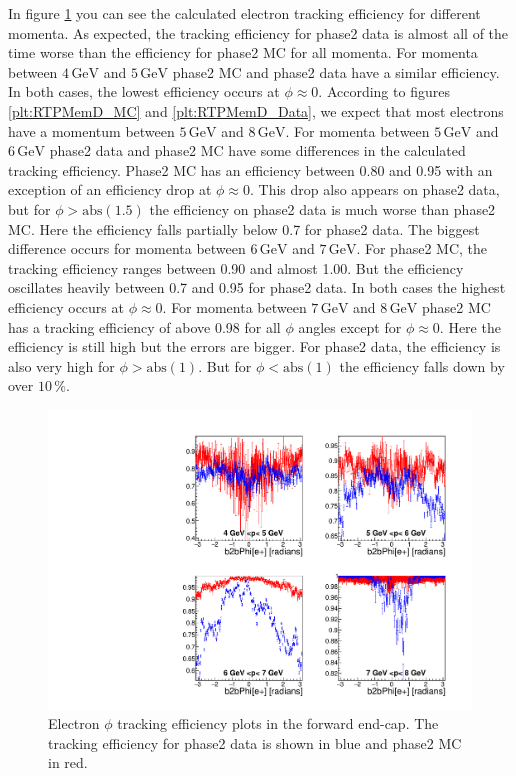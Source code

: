 \documentclass[a4paper,11pt,twosided,final,german,openbib,pdftex,listof=totoc,bibliography=totoc]{scrbook}
\begin{document}
In figure \ref{plt:xPMPhiemFC} you can see the calculated electron tracking efficiency for different momenta. As expected, the tracking efficiency for phase2 data is almost all of the time worse than the efficiency for phase2 MC for all momenta. For momenta between $4\,\textrm{GeV}$ and $5\,\textrm{GeV}$ phase2 MC and phase2 data have a similar efficiency. In both cases, the lowest efficiency occurs at $\phi \approx 0$. According to figures \ref{plt:RTPMemD_MC} and \ref{plt:RTPMemD_Data}, we expect that most electrons have a momentum between $5\,\textrm{GeV}$ and $8\,\textrm{GeV}$. For momenta between $5\,\textrm{GeV}$ and $6\,\textrm{GeV}$ phase2 data and phase2 MC have some differences in the calculated tracking efficiency. Phase2 MC has an efficiency between 0.80 and 0.95 with an exception of an efficiency drop at $\phi \approx 0$. This drop also appears on phase2 data, but for $\phi > \textrm{abs}(1.5)$ the efficiency on phase2 data is much worse than phase2 MC. Here the efficiency falls partially below 0.7 for phase2 data.
The biggest difference occurs for momenta between $6\,\textrm{GeV}$ and $7\,\textrm{GeV}$. For phase2 MC, the tracking efficiency ranges between 0.90 and almost 1.00. But the efficiency oscillates heavily between 0.7 and 0.95 for phase2 data. In both cases the highest efficiency occurs at $\phi \approx 0$. 
For momenta between $7\,\textrm{GeV}$ and $8\,\textrm{GeV}$ phase2 MC has a tracking efficiency of above 0.98 for all $\phi$ angles except for $\phi \approx 0$. Here the efficiency is still high but the errors are bigger. For phase2 data, the efficiency is also very high for $\phi >\textrm{abs}(1)$. But for $\phi < \textrm{abs}(1)$ the efficiency falls down by over $10\,\%$.






\begin{figure}[!htbp]
	\centering
	\includegraphics[width=\textwidth]{Plots/master/xPMPhiemFC}
	\caption[Momentum $\phi$ Electron Forward End-Cap Efficiency Phase2]{Electron $\phi$ tracking efficiency plots in the forward end-cap. The tracking efficiency for phase2 data is shown in blue and phase2 MC in red.}
		\label{plt:xPMPhiemFC}
\end{figure}
\end{document}
